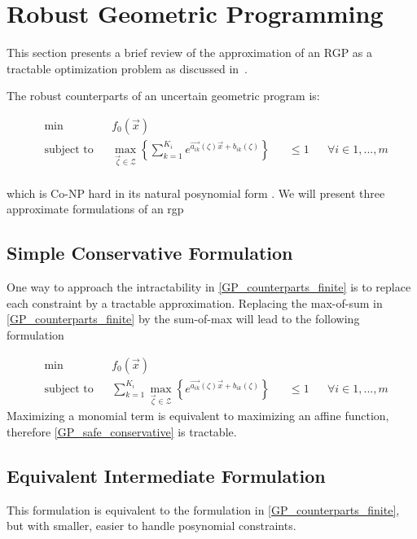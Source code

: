 \section{Robust Geometric Programming} \label{RGP}
This section presents a brief review of the approximation of an RGP as a tractable optimization problem as discussed in~\cite{Saab2018}.

The robust counterparts of an uncertain geometric program is:

\begin{equation}
\begin{aligned}
& \min &&f_0\left(\vec{x}\right)\\
& \text{subject to} &&\max_{\vec{\zeta} \in \mathcal{Z}} \left\{\textstyle{\sum}_{k=1}^{K_i}e^{\vec{a_{ik}}\left(\zeta\right)\vec{x} + b_{ik}\left(\zeta\right)}\right\} &&\leq 1 &&\forall i \in 1,...,m\\
\end{aligned}
\label{GP_counterparts_finite}
\end{equation}

which is Co-NP hard in its natural posynomial form \cite{RGPcoNP}. We will present three approximate formulations of an \gls{rgp}

\subsection{Simple Conservative Formulation}
One way to approach the intractability in \eqref{GP_counterparts_finite} is to replace each constraint by a tractable approximation.
Replacing the max-of-sum in \eqref{GP_counterparts_finite} by the sum-of-max will lead to the following formulation

\begin{equation}
\begin{aligned}
& \min &&f_0\left(\vec{x}\right)\\
& \text{subject to} &&\textstyle{\sum}_{k=1}^{K_i} {\displaystyle \max_{\vec{\zeta} \in \mathcal{Z}}} \left\{e^{\vec{a_{ik}}\left(\zeta\right)\vec{x} + b_{ik}\left(\zeta\right)}\right\} &&\leq 1 &&\forall i \in 1,...,m
\end{aligned}
\label{GP_safe_conservative}
\end{equation}
Maximizing a monomial term is equivalent to maximizing an affine function, therefore \eqref{GP_safe_conservative} is tractable.

\subsection{Equivalent Intermediate Formulation}
This formulation is equivalent to the formulation in \eqref{GP_counterparts_finite}, but with smaller, easier to handle posynomial constraints.

